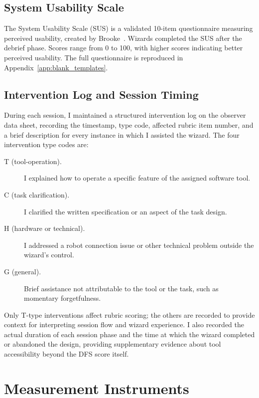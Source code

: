 \subsection{System Usability Scale}

The System Usability Scale (SUS) is a validated 10-item questionnaire measuring perceived usability, created by Brooke~\cite{Brooke1996}. Wizards completed the SUS after the debrief phase. Scores range from 0 to 100, with higher scores indicating better perceived usability. The full questionnaire is reproduced in Appendix~\ref{app:blank_templates}.

\subsection{Intervention Log and Session Timing}

During each session, I maintained a structured intervention log on the observer data sheet, recording the timestamp, type code, affected rubric item number, and a brief description for every instance in which I assisted the wizard. The four intervention type codes are:

\begin{description}
    \item[T (tool-operation).] I explained how to operate a specific feature of the assigned software tool.
    \item[C (task clarification).] I clarified the written specification or an aspect of the task design.
    \item[H (hardware or technical).] I addressed a robot connection issue or other technical problem outside the wizard's control.
    \item[G (general).] Brief assistance not attributable to the tool or the task, such as momentary forgetfulness.
\end{description}

Only T-type interventions affect rubric scoring; the others are recorded to provide context for interpreting session flow and wizard experience. I also recorded the actual duration of each session phase and the time at which the wizard completed or abandoned the design, providing supplementary evidence about tool accessibility beyond the DFS score itself.

\section{Measurement Instruments}

